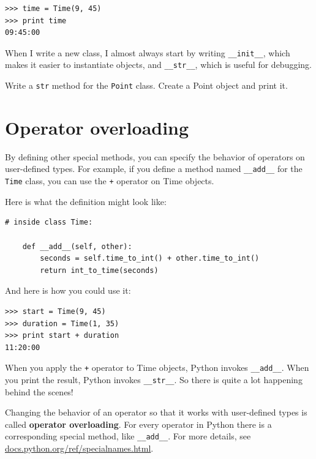 \documentclass[10pt]{book}
\begin{document}

\beforeverb
\begin{verbatim}
>>> time = Time(9, 45)
>>> print time
09:45:00
\end{verbatim}
\afterverb
%
When I write a new class, I almost always start by writing 
\verb"__init__", which makes it easier to instantiate objects, and 
\verb"__str__", which is useful for debugging.


\begin{ex}
Write a {\tt str} method for the {\tt Point} class.  Create
a Point object and print it.
\end{ex}


\section{Operator overloading}
\label{operator overloading}

By defining other special methods, you can specify the behavior
of operators on user-defined types.  For example, if you define
a method named \verb"__add__" for the {\tt Time} class, you can use the
{\tt +} operator on Time objects.

Here is what the definition might look like:


\beforeverb
\begin{verbatim}
# inside class Time:

    def __add__(self, other):
        seconds = self.time_to_int() + other.time_to_int()
        return int_to_time(seconds)
\end{verbatim}
\afterverb
%
And here is how you could use it:

\beforeverb
\begin{verbatim}
>>> start = Time(9, 45)
>>> duration = Time(1, 35)
>>> print start + duration
11:20:00
\end{verbatim}
\afterverb
%
When you apply the {\tt +} operator to Time objects, Python invokes
\verb"__add__".  When you print the result, Python invokes 
\verb"__str__".  So there is quite a lot happening behind the scenes!


Changing the behavior of an operator so that it works with
user-defined types is called {\bf operator overloading}.  For every
operator in Python there is a corresponding special method, like 
\verb"__add__".  For more details, see
\url{docs.python.org/ref/specialnames.html}.
\end{document}
